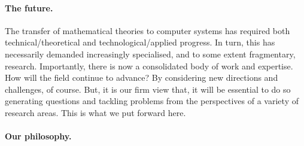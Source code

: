 \documentclass[11pt,twocolumn]{article}
\begin{document}
\paragraph*{The future.}

The transfer of mathematical theories to computer systems has required
both technical/theoretical and technological/applied progress.  In turn,
this has necessarily demanded increasingly specialised, and to some extent
fragmentary, research.  Importantly, there is now a consolidated body of
work and expertise.  How will the field continue to advance?  By
considering new directions and challenges, of course.  But, it is our firm
view that, %
it will be essential to do so generating questions and tackling problems
from the perspectives of a variety of research areas.  This is %
what we put forward here.

\paragraph*{Our philosophy.}
\end{document}
